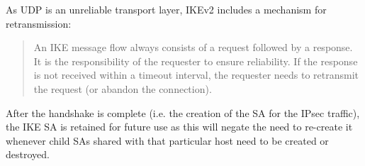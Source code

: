 \documentclass[final,a4paper,twoside,11pt,onecolumn]{report}
\begin{document}
As UDP is an unreliable transport layer, IKEv2 includes a mechanism for retransmission:

\begin{quotation}
An IKE message flow always consists of a request followed by a response. It is the responsibility of the requester to ensure reliability. If the response is not received within a timeout interval, the requester needs to retransmit the request (or abandon the connection).
\end{quotation}

After the handshake is complete (i.e. the creation of the SA for the IPsec traffic), the IKE SA is retained for future use as this will negate the need to re-create it whenever child SAs shared with that particular host need to be created or destroyed.




% 
% 
% 






\end{document}
